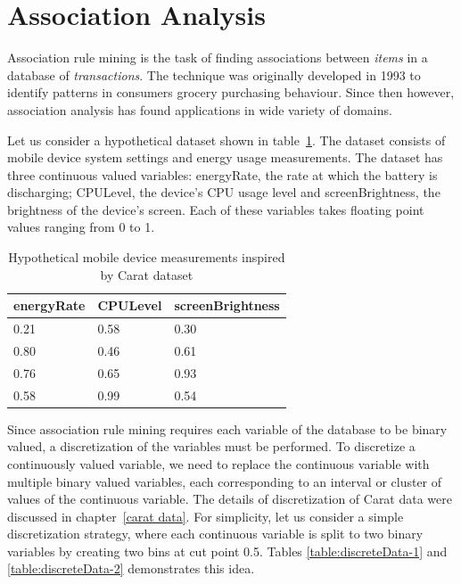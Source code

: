 \section{Association Analysis} \label{association analysis}

Association rule mining is the task of finding associations between \textit{items} in a database of \textit{transactions}. The technique was originally developed in 1993 to identify patterns in consumers grocery purchasing behaviour. Since then however, association analysis has found applications in wide variety of domains.

Let us consider a hypothetical dataset shown in table~\ref{table:raw-data}. The dataset consists of mobile device system settings and energy usage measurements. The dataset has three continuous valued variables:  energyRate, the rate at which the battery is discharging;  CPULevel, the device's CPU usage level and screenBrightness, the brightness of the device's screen. Each of these variables takes floating point values ranging from 0 to 1.
\begin{table}[htb]
    \begin{tabular}{ | l | l | l | }
    \hline
    \textbf{energyRate} & \textbf{CPULevel} & \textbf{screenBrightness} \\ \hline
    0.21 & 0.58 & 0.30 \\ \hline 
    0.80 & 0.46 & 0.61 \\ \hline 
    0.76 & 0.65 & 0.93 \\ \hline 
    0.58 & 0.99 & 0.54 \\ \hline 
    \end{tabular}
	\caption{Hypothetical mobile device measurements inspired by Carat dataset}
	\label{table:raw-data}
\end{table}

Since association rule mining requires each variable of the database to be binary valued, a discretization of the variables must be performed. To discretize a continuously valued variable, we need to replace the continuous variable with multiple binary valued variables, each corresponding to an interval or cluster of values of the continuous variable. The details of discretization of Carat data were discussed in chapter~\ref{carat data}. For simplicity, let us consider a simple discretization strategy, where each continuous variable is split to two binary variables by creating two bins at cut point 0.5. Tables \ref{table:discreteData-1} and \ref{table:discreteData-2} demonstrates this idea.

